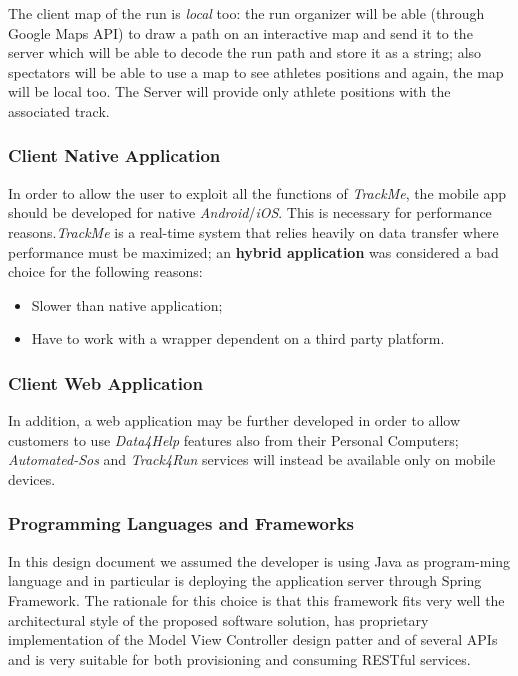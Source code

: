 \documentclass[a4paper]{article}
\begin{document}
The client map of the run is \textit{local} too: the run organizer will be able (through Google Maps API) to draw a path on an interactive map and send it to the server which will be able to decode the run path and store it as a string; also spectators will be able to use a map to see athletes positions and again, the map will be local too. The Server will provide only athlete positions with the associated track.

\subsubsection{Client Native Application}
In order to allow the user to exploit all the functions of \textit{TrackMe}, the mobile app should be developed for native \textit{Android}/\textit{iOS}. This is necessary for performance reasons.\textit{TrackMe} is a real-time system that relies heavily on data transfer where performance must be maximized; an \textbf{hybrid application} was considered a bad choice for the following reasons:\\
\begin{itemize}
    \item Slower than native application;
    \item Have to work with a wrapper dependent on a third party platform.
\end{itemize}

\subsubsection{Client Web Application}
In addition, a web application may be further developed in order to allow customers to use \textit{Data4Help} features also from their Personal Computers; \textit{Automated-Sos} and \textit{Track4Run} services will instead be available only on mobile devices.

\subsubsection{Programming Languages and Frameworks}
In this design document we assumed the developer is using Java as program-\newline ming language and in particular is deploying the application server through Spring Framework. The rationale for this choice is that this framework fits very well the architectural style of the proposed software solution, has proprietary implementation of the Model View Controller design patter and of several APIs and is very suitable for both provisioning and consuming RESTful services. \\
\end{document}
